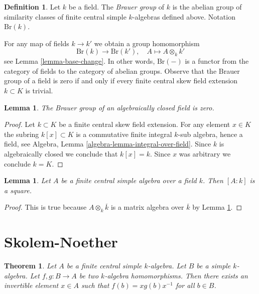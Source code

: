 \documentclass{stacks-project}
\theoremstyle{plain}
\newtheorem{theorem}[subsection]{Theorem}
\newtheorem{lemma}[subsection]{Lemma}
\theoremstyle{definition}
\newtheorem{definition}[subsection]{Definition}
\theoremstyle{remark}
\numberwithin{equation}{subsection}
\begin{document}
\begin{definition}
\label{definition-brauer-group}
Let $k$ be a field. The {\it Brauer group} of $k$ is the abelian group
of similarity classes of finite central simple $k$-algebras defined
above. Notation $\text{Br}(k)$.
\end{definition}

\noindent
For any map of fields $k \to k'$ we obtain a group homomorphism
$$
\text{Br}(k) \longrightarrow \text{Br}(k'),\quad
A \longmapsto A \otimes_k k'
$$
see Lemma \ref{lemma-base-change}. In other words, $\text{Br}(-)$ is
a functor from the category of fields to the category of abelian groups.
Observe that the Brauer group
of a field is zero if and only if every finite central skew field
extension $k \subset K$ is trivial.

\begin{lemma}
\label{lemma-brauer-algebraically-closed}
The Brauer group of an algebraically closed field is zero.
\end{lemma}

\begin{proof}
Let $k \subset K$ be a finite central skew field extension.
For any element $x \in K$ the subring $k[x] \subset K$ is a
commutative finite integral $k$-sub algebra, hence a field, see
Algebra, Lemma \ref{algebra-lemma-integral-over-field}.
Since $k$ is algebraically closed we conclude that
$k[x] = k$. Since $x$ was arbitrary we conclude $k = K$.
\end{proof}

\begin{lemma}
\label{lemma-dimension-square}
Let $A$ be a finite central simple algebra over a field $k$.
Then $[A : k]$ is a square.
\end{lemma}

\begin{proof}
This is true because $A \otimes_k \overline{k}$ is a matrix
algebra over $\overline{k}$ by
Lemma \ref{lemma-brauer-algebraically-closed}.
\end{proof}




\section{Skolem-Noether}
\label{section-skolem-noether}



\begin{theorem}
\label{theorem-skolem-noether}
Let $A$ be a finite central simple $k$-algebra. Let $B$ be a simple
$k$-algebra. Let $f, g : B \to A$ be two $k$-algebra homomorphisms.
Then there exists an invertible element $x \in A$ such that
$f(b) = xg(b)x^{-1}$ for all $b \in B$.
\end{theorem}
\end{document}
